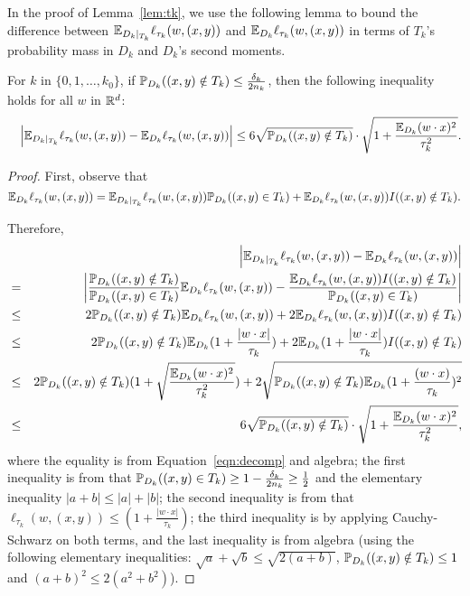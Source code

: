 In the proof of Lemma~\ref{lem:tk}, we use the following lemma to bound the difference between $\E_{D_k |_{T_k}} \ell_{\tau_k}(w, (x, y))$ and
$\E_{D_k} \ell_{\tau_k}(w, (x, y))$ in terms of $T_k$'s probability mass in $D_k$ and $D_k$'s second moments.
\begin{lemma}
For $k$ in $\{0,1,\ldots,k_0\}$, if $\P_{D_k}((x,y) \notin T_k) \leq \frac {\delta_k} {2n_k}$, then the following inequality holds for all $w$ in $\R^d$:
\begin{eqnarray*}
&&\left|\E_{D_k |_{T_k}} \ell_{\tau_k}(w, (x, y)) - \E_{D_k} \ell_{\tau_k}(w, (x, y)) \right|
\leq
 6 \sqrt{\P_{D_k}((x,y) \notin T_k)} \cdot \sqrt{1 + \frac{\E_{D_k}(w \cdot x)^2}{\tau_k^2}}.
\end{eqnarray*}
\label{lem:conditional}
\end{lemma}
\begin{proof}
First, observe that
\begin{equation}
\E_{D_k} \ell_{\tau_k}(w, (x, y)) = \E_{D_k |_{T_k}} \ell_{\tau_k}(w, (x, y)) \P_{D_k}((x,y) \in T_k) + \E_{D_k} \ell_{\tau_k}(w, (x, y)) I((x,y) \notin T_k).
\label{eqn:decomp}
\end{equation}

Therefore,
\begin{eqnarray}
&& \left|\E_{D_k |_{T_k}} \ell_{\tau_k}(w, (x, y)) - \E_{D_k} \ell_{\tau_k}(w, (x, y)) \right| \nonumber \\
&=& \left|\frac{\P_{D_k}((x,y) \notin T_k)}{\P_{D_k}((x,y) \in T_k)} \E_{D_k} \ell_{\tau_k}(w, (x, y)) - \frac{\E_{D_k} \ell_{\tau_k}(w, (x, y)) I((x,y) \notin T_k)}{\P_{D_k}((x,y) \in T_k)}  \right| \nonumber \\
&\leq& 2 \P_{D_k}((x,y) \notin T_k) \E_{D_k} \ell_{\tau_k}(w, (x, y)) + 2 \E_{D_k} \ell_{\tau_k}(w, (x, y)) I((x,y) \notin T_k) \nonumber \\
&\leq& 2 \P_{D_k}((x,y) \notin T_k) \E_{D_k} (1 + \frac{|w \cdot x|}{\tau_k}) + 2 \E_{D_k} (1 + \frac{|w \cdot x|}{\tau_k}) I((x,y) \notin T_k) \nonumber \\
&\leq& 2 \P_{D_k}((x,y) \notin T_k) (1 + \sqrt{\frac{\E_{D_k}(w \cdot x)^2}{\tau_k^2}}) + 2 \sqrt{\P_{D_k}((x,y) \notin T_k) \E_{D_k}(1 + \frac{(w \cdot x)}{\tau_k})^2 } \nonumber\\
&\leq& 6 \sqrt{\P_{D_k}((x,y) \notin T_k)} \cdot \sqrt{1 + \frac{\E_{D_k}(w \cdot x)^2}{\tau_k^2}}, \nonumber
\end{eqnarray}
where the equality is from Equation~\eqref{eqn:decomp} and algebra; the first inequality is from that $\P_{D_k}((x,y) \in T_k) \geq 1 - \frac{\delta_k}{2n_k} \geq \frac 1 2$ and the elementary inequality $|a+b| \leq |a|+|b|$;
the second inequality is from that $\ell_{\tau_k}(w,(x,y)) \leq (1 + \frac{|w \cdot x|}{\tau_k})$;
the third inequality is by applying Cauchy-Schwarz on both terms, and the last inequality is from algebra (using the following elementary inequalities: $\sqrt{a} + \sqrt{b} \leq \sqrt{2(a+b)}$, $\P_{D_k}((x,y) \notin T_k) \leq 1$ and $(a+b)^2 \leq 2(a^2+b^2)$).
\end{proof}


